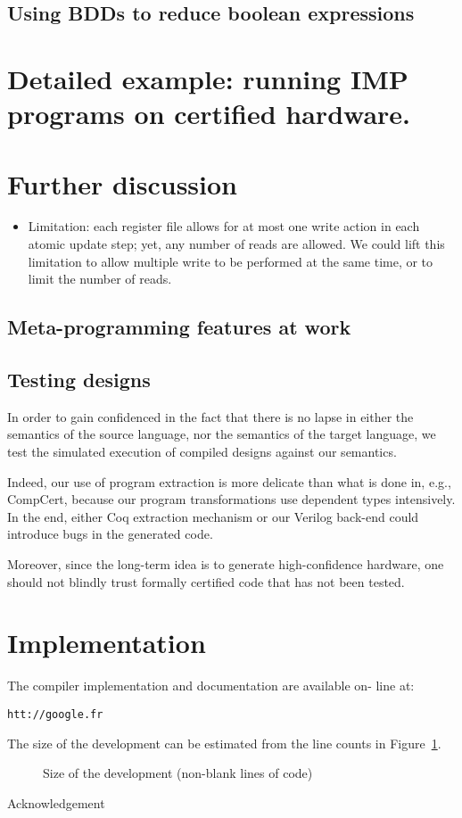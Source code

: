 \documentclass[preprint]{sigplanconf}
\begin{document}
\subsection{Using BDDs to reduce boolean expressions}

\section{Detailed example: running IMP programs on certified
  hardware.}

\section{Further discussion}\label{sec:discussion}
\begin{itemize}
\item Limitation: each register file allows for at most one write
  action in each atomic update step; yet, any number of reads are
  allowed. We could lift this limitation to allow multiple write
  to be performed at the same time, or to limit the number of reads. 

\end{itemize}
\subsection{Meta-programming features at work}

\subsection{Testing designs}
In order to gain confidenced in the fact that there is no lapse in
either the semantics of the source language, nor the semantics of the
target language, we test the simulated execution of compiled designs
against our semantics. 

Indeed, our use of program extraction is more delicate than what is
done in, e.g., CompCert, because our program transformations use
dependent types intensively. In the end, either Coq extraction
mechanism or our Verilog back-end could introduce bugs in the
generated code.

Moreover, since the long-term idea is to generate high-confidence
hardware, one should not blindly trust formally certified code that
has not been tested.

\section{Implementation}
The compiler implementation and documentation are available on- line
at: 
%
\begin{center}
  \texttt{htt://google.fr}
\end{center}
%
The size of the development can be estimated from the line counts in
Figure~\ref{fig:loc}.
\begin{figure}
  \centering  
  \caption{Size of the development (non-blank lines of code)}
  \label{fig:loc}
\end{figure}






\acks Acknowledgement



\end{document}
